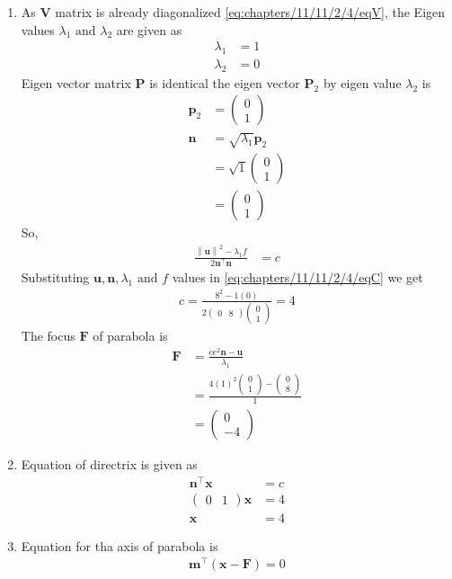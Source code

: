 \documentclass[12pt]{article}
\providecommand{\brak}[1]{\ensuremath{\left(#1\right)}}
\providecommand{\norm}[1]{\left\lVert#1\right\rVert}
\newcommand{\myvec}[1]{\ensuremath{\begin{pmatrix}#1\end{pmatrix}}}
\let\vec\mathbf
\begin{document}
\begin{enumerate}
\item As   $\vec{V}$ matrix is already diagonalized \eqref{eq:chapters/11/11/2/4/eqV}, the Eigen values $\lambda_1 \text{ and } \lambda_2$ are given as
\begin{align}
	\label{eq:chapters/11/11/2/4/eqEigen1}
	\lambda_1 &= 1\\
	\label{eq:chapters/11/11/2/4/eqEigen2}
	\lambda_2 &= 0
\end{align}
Eigen vector matrix $\vec{P}$ is identical the eigen vector $\vec{P}_2$ by eigen value $\lambda_2$ is 
\begin{align}
	\vec{p}_2 &= \myvec{0\\1}\\
	\vec{n} &= \sqrt{\lambda_1}\vec{p}_2\\
		&= \sqrt{1}\myvec{0\\1}\\
		&= \myvec{0\\1}
\end{align}
So,
\begin{align}
	\label{eq:chapters/11/11/2/4/eqC}
	 \frac{\norm{\vec{u}}^2 - \lambda_1 f}{2\vec{u}^\top \vec{n}}&= c
\end{align}
Substituting  $\vec{u},\vec{n},\lambda_1 \text{ and } f$ values in \eqref{eq:chapters/11/11/2/4/eqC} we get 
\begin{align}
	c = \frac{8^2-1\brak{0}}{2\myvec{0&8}\myvec{0\\1}} = 4
\end{align}
The focus $\vec{F}$ of parabola is 
\begin{align}
	\vec{F} &= \frac{ce^2 \vec{n}-\vec{u}}{\lambda_1}\\
		&= \frac{4\brak{1}^2 \myvec{0\\1}-\myvec{0\\8}}{1}\\
		&= \myvec{0\\-4}
\end{align}
\item Equation of directrix is given as
\begin{align}
	\vec{n}^\top \vec{x} &= c\\
	\myvec{0&1}\vec{x} &= 4\\
	\vec{x}&= 4
\end{align}
\item Equation for tha axis of parabola is 
\begin{align}
	\vec{m}^\top \brak{\vec{x}-\vec{F}} = 0\label{20}
\end{align}

\end{enumerate}
\end{document}
